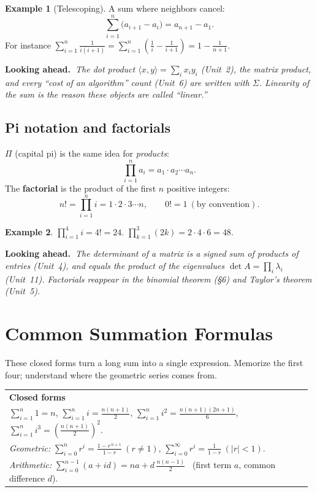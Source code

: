 \documentclass[11pt]{article}
\makeatletter
\theoremstyle{definition}
\newtheorem{example}{Example}[section]
\newcommand{\keybox}[2]{%
  \par\smallskip\noindent
  \begin{tabular}{@{}p{0.985\linewidth}@{}}
  \arrayrulecolor{RoyalBlue}\toprule
  {\sffamily\bfseries\color{RoyalBlue}#1}\\[2pt]#2\\
  \bottomrule
  \end{tabular}\par\smallskip}
\newcommand{\lookahead}[1]{%
  \par\smallskip\noindent
  {\sffamily\bfseries\color{BrickRed}Looking ahead.~}\textit{#1}\par\smallskip}
\newcommand{\ds}{\displaystyle}
\makeatother
\begin{document}
\begin{example}[Telescoping]
A sum where neighbors cancel:
\[
\sum_{i=1}^{n}\bigl(a_{i+1}-a_i\bigr)=a_{n+1}-a_1 .
\]
For instance $\sum_{i=1}^{n}\frac{1}{i(i+1)}=\sum_{i=1}^{n}\!\left(\frac1i-\frac1{i+1}\right)=1-\frac{1}{n+1}.$
\end{example}

\lookahead{The dot product $\langle x,y\rangle=\sum_i x_i y_i$ (Unit~2), the
matrix product, and every ``cost of an algorithm'' count (Unit~6) are written
with $\Sigma$. Linearity of the sum \emph{is} the reason these objects are called
``linear.''}

\subsection{Pi notation and factorials}
$\Pi$ (capital pi) is the same idea for \emph{products}:
\[
\prod_{i=1}^{n} a_i = a_1\cdot a_2\cdots a_n .
\]
The \textbf{factorial} is the product of the first $n$ positive integers:
\[
n! = \prod_{i=1}^{n} i = 1\cdot 2\cdot 3\cdots n,\qquad 0!=1 \ (\text{by convention}).
\]

\begin{example}
$\ds\prod_{i=1}^{4} i = 4! = 24.$ \qquad
$\ds\prod_{k=1}^{3}(2k) = 2\cdot4\cdot6 = 48.$
\end{example}

\lookahead{The determinant of a matrix is a signed sum of \emph{products} of
entries (Unit~4), and equals the \emph{product} of the eigenvalues
$\det A=\prod_i\lambda_i$ (Unit~11). Factorials reappear in the binomial theorem
(\S6) and Taylor's theorem (Unit~5).}

\section{Common Summation Formulas}
These closed forms turn a long sum into a single expression. Memorize the first
four; understand where the geometric series comes from.

\keybox{Closed forms}{%
$\ds\sum_{i=1}^{n} 1 = n$,\qquad
$\ds\sum_{i=1}^{n} i = \frac{n(n+1)}{2}$,\qquad
$\ds\sum_{i=1}^{n} i^2 = \frac{n(n+1)(2n+1)}{6}$,\qquad
$\ds\sum_{i=1}^{n} i^3 = \left(\frac{n(n+1)}{2}\right)^{\!2}$.\\[6pt]
\emph{Geometric:}\quad
$\ds\sum_{i=0}^{n} r^{i} = \frac{1-r^{\,n+1}}{1-r}\ (r\neq 1)$,\qquad
$\ds\sum_{i=0}^{\infty} r^{i} = \frac{1}{1-r}\ (|r|<1)$.\\[6pt]
\emph{Arithmetic:}\quad
$\ds\sum_{i=0}^{n-1}(a+id) = na + d\,\frac{n(n-1)}{2}$ \ (first term $a$, common difference $d$).}
\end{document}
